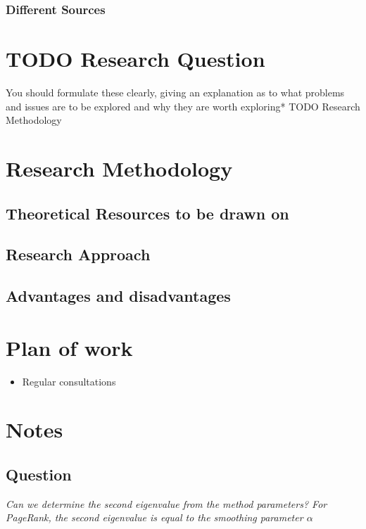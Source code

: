 \documentclass[11pt]{article}
\begin{document}
\subsubsection{Different Sources}
\label{sec:org9ba07d1}

\section{{\bfseries\sffamily TODO} Research Question}
\label{sec:org924ea90}
You should formulate these clearly, giving an explanation as to what problems
and issues are to be explored and why they are worth exploring* TODO Research
Methodology

\section{Research Methodology}
\label{sec:orgf061ffb}

\subsection{Theoretical Resources to be drawn on}
\label{sec:orgbe2f941}
\subsection{Research Approach}
\label{sec:orge8d8375}
\subsection{Advantages and disadvantages}
\label{sec:orgb258c2d}
\section{Plan of work}
\label{sec:org8288834}
\begin{itemize}
\item Regular consultations
\end{itemize}

\section{Notes}
\label{sec:org843f175}

\subsection{Question}
\label{sec:org2c91cae}

\emph{Can we determine the second eigenvalue from the method parameters? For
PageRank, the second eigenvalue is equal to the smoothing parameter \(\alpha\)}
\end{document}
